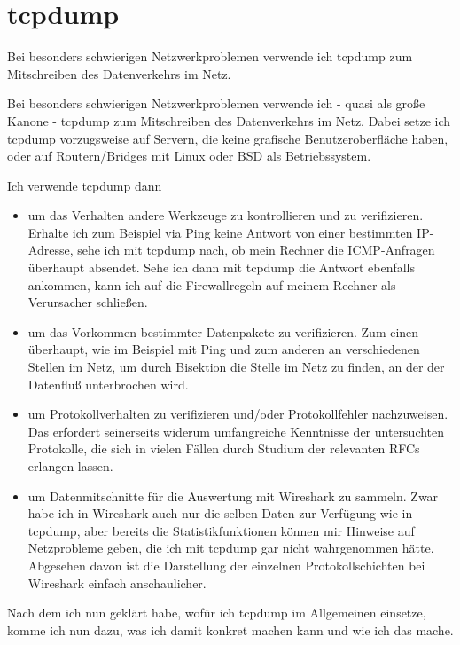 \section{tcpdump}
\label{sec:netz-werkzeuge-tcpdump}
\begin{abstractsec}
  Bei besonders schwierigen Netzwerkproblemen verwende ich tcpdump zum
  Mitschreiben des Datenverkehrs im Netz.
\end{abstractsec}
\begin{normaltext}
  Bei besonders schwierigen Netzwerkproblemen verwende ich - quasi als große
  Kanone - tcpdump zum Mitschreiben des Datenverkehrs im Netz. Dabei setze ich
  tcpdump vorzugsweise auf Servern, die keine grafische Benutzeroberfläche
  haben, oder auf Routern/Bridges mit Linux oder BSD als Betriebssystem.

  Ich verwende tcpdump dann
  \begin{itemize}
    \item um das Verhalten andere Werkzeuge zu kontrollieren und zu
      verifizieren. Erhalte ich zum Beispiel via Ping keine Antwort von einer
      bestimmten IP-Adresse, sehe ich mit tcpdump nach, ob mein Rechner die
      ICMP-Anfragen überhaupt absendet. Sehe ich dann mit tcpdump die Antwort
      ebenfalls ankommen, kann ich auf die Firewallregeln auf meinem Rechner
      als Verursacher schließen.
    \item um das Vorkommen bestimmter Datenpakete zu verifizieren. Zum einen
      überhaupt, wie im Beispiel mit Ping und zum anderen an verschiedenen
      Stellen im Netz, um durch Bisektion die Stelle im Netz zu finden, an der
      der Datenfluß unterbrochen wird.
    \item um Protokollverhalten zu verifizieren und/oder Protokollfehler
      nachzuweisen. Das erfordert seinerseits widerum umfangreiche Kenntnisse
      der untersuchten Protokolle, die sich in vielen Fällen durch Studium der
      relevanten RFCs erlangen lassen.
    \item um Datenmitschnitte für die Auswertung mit Wireshark zu sammeln.
      Zwar habe ich in Wireshark auch nur die selben Daten zur Verfügung wie
      in tcpdump, aber bereits die Statistikfunktionen können mir Hinweise auf
      Netzprobleme geben, die ich mit tcpdump gar nicht wahrgenommen hätte.
      Abgesehen davon ist die Darstellung der einzelnen Protokollschichten bei
      Wireshark einfach anschaulicher.
  \end{itemize}

  Nach dem ich nun geklärt habe, wofür ich tcpdump im Allgemeinen einsetze,
  komme ich nun dazu, was ich damit konkret machen kann und wie ich das mache.


\end{normaltext}
